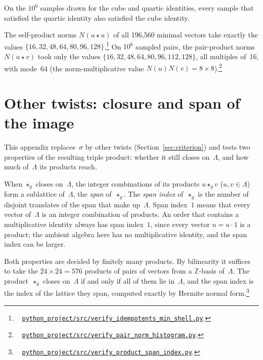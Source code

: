 \documentclass[twoside,english]{paper}
\numberwithin{equation}{section}
\numberwithin{figure}{section}
\theoremstyle{definition}
\theoremstyle{remark}
\newcommand{\ZZ}{\mathbb{Z}}
\newcommand{\LL}{\Lambda}             %
\newcommand{\Nrm}{N}                  %
\newcommand{\scriptref}[1]{\cite{repo}~%
  \href{https://github.com/koeplinger/leech\_alg/blob/main/python\_project/src/#1}%
  {\nolinkurl{python_project/src/#1}}}
\begin{document}
On the $10^6$ samples drawn for the cube and quartic identities, every
sample that satisfied the quartic identity also satisfied the cube
identity.

The self-product norms $\Nrm(u \star u)$ of all 196{,}560 minimal
vectors take exactly the values $\{16, 32, 48, 64, 80, 96,
128\}$.\footnote{\scriptref{verify\_idempotents\_min\_shell.py}.}  On
$10^6$ sampled pairs, the pair-product norms $\Nrm(u \star v)$ took
only the values $\{16, 32, 48, 64, 80, 96, 112, 128\}$, all multiples
of~16, with mode~64 (the norm-multiplicative value $\Nrm(u)\Nrm(v) = 8
\times 8$).\footnote{\scriptref{verify\_pair\_norm\_histogram.py}.}

\section{Other twists: closure and span of the
image}\label{sec:census}\label{sec:span}

This appendix replaces~$\sigma$ by other twists
(Section~\ref{sec:criterion}) and tests two properties of the
resulting triple product: whether it still closes on~$\LL$, and how
much of~$\LL$ its products reach.

When $\star_g$ closes on~$\LL$, the integer combinations of its
products $u \star_g v$ ($u, v \in \LL$) form a sublattice of~$\LL$,
the \emph{span} of~$\star_g$.  The \emph{span index} of~$\star_g$ is
the number of disjoint translates of the span that make up~$\LL$.  Span index~$1$ means that every vector
of~$\LL$ is an integer combination of products.  An order that
contains a multiplicative identity always has span index~$1$, since
every vector $u = u \cdot 1$ is a product; the ambient algebra here
has no multiplicative identity, and the span index can be larger.

Both properties are decided by finitely many products.  By
bilinearity it suffices to take the $24 \times 24 = 576$ products of
pairs of vectors from a $\ZZ$-basis of~$\LL$.  The product~$\star_g$
closes on~$\LL$ if and only if all of them lie in~$\LL$, and the span
index is the index of the lattice they span, computed exactly by
Hermite normal form.\footnote{\scriptref{verify\_product\_span\_index.py}.}
\end{document}
